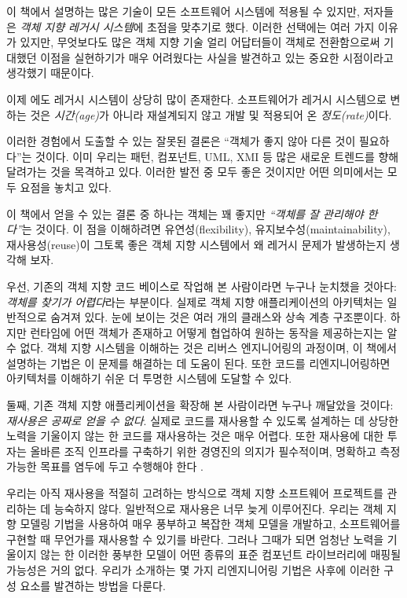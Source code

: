 \documentclass[a4paper,10pt,twoside]{book}
\begin{document}
이 책에서 설명하는 많은 기술이 모든 소프트웨어 시스템에 적용될 수 있지만, 저자들은 \emph{객체 지향 레거시 시스템}에 초점을 맞추기로 했다. 이러한 선택에는 여러 가지 이유가 있지만, 무엇보다도 많은 객체 지향 기술 얼리 어답터들이 객체로 전환함으로써 기대했던 이점을 실현하기가 매우 어려웠다는 사실을 발견하고 있는 중요한 시점이라고 생각했기 때문이다.

이제 에도 레거시 시스템이 상당히 많이 존재한다. 소프트웨어가 레거시 시스템으로 변하는 것은 \emph{시간(age)}가 아니라 재설계되지 않고 개발 및 적용되어 온 \emph{정도(rate)}이다.

이러한 경험에서 도출할 수 있는 잘못된 결론은 ``객체가 좋지 않아 다른 것이 필요하다''는 것이다. 이미 우리는 패턴, 컴포넌트, UML, XMI 등 많은 새로운 트렌드를 향해 달려가는 것을 목격하고 있다. 이러한 발전 중 모두 좋은 것이지만 어떤 의미에서는 모두 요점을 놓치고 있다.

이 책에서 얻을 수 있는 결론 중 하나는 객체는 꽤 좋지만 \emph{``객체를 잘 관리해야 한다''}는 것이다. 이 점을 이해하려면 유연성(flexibility), 유지보수성(maintainability), 재사용성(reuse)이 그토록 좋은 객체 지향 시스템에서 왜 레거시 문제가 발생하는지 생각해 보자.

우선, 기존의 객체 지향 코드 베이스로 작업해 본 사람이라면 누구나 눈치챘을 것아다: \emph{객체를 찾기가 어렵다}라는 부분이다. 실제로 객체 지향 애플리케이션의 아키텍처는 일반적으로 숨겨져 있다. 눈에 보이는 것은 여러 개의 클래스와 상속 계층 구조뿐이다. 하지만 런타임에 어떤 객체가 존재하고 어떻게 협업하여 원하는 동작을 제공하는지는 알 수 없다. 객체 지향 시스템을 이해하는 것은 리버스 엔지니어링의 과정이며, 이 책에서 설명하는 기법은 이 문제를 해결하는 데 도움이 된다. 또한 코드를 리엔지니어링하면 아키텍처를 이해하기 쉬운 더 투명한 시스템에 도달할 수 있다.

둘째, 기존 객체 지향 애플리케이션을 확장해 본 사람이라면 누구나 깨달았을 것이다: \emph{재사용은 공짜로 얻을 수 없다}. 실제로 코드를 재사용할 수 있도록 설계하는 데 상당한 노력을 기울이지 않는 한 코드를 재사용하는 것은 매우 어렵다. 또한 재사용에 대한 투자는 올바른 조직 인프라를 구축하기 위한 경영진의 의지가 필수적이며, 명확하고 측정 가능한 목표를 염두에 두고 수행해야 한다 \cite{Gold95a}.

우리는 아직 재사용을 적절히 고려하는 방식으로 객체 지향 소프트웨어 프로젝트를 관리하는 데 능숙하지 않다. 일반적으로 재사용은 너무 늦게 이루어진다. 우리는 객체 지향 모델링 기법을 사용하여 매우 풍부하고 복잡한 객체 모델을 개발하고, 소프트웨어를 구현할 때 무언가를 재사용할 수 있기를 바란다. 그러나 그때가 되면 엄청난 노력을 기울이지 않는 한 이러한 풍부한 모델이 어떤 종류의 표준 컴포넌트 라이브러리에 매핑될 가능성은 거의 없다. 우리가 소개하는 몇 가지 리엔지니어링 기법은 사후에 이러한 구성 요소를 발견하는 방법을 다룬다.
\end{document}
